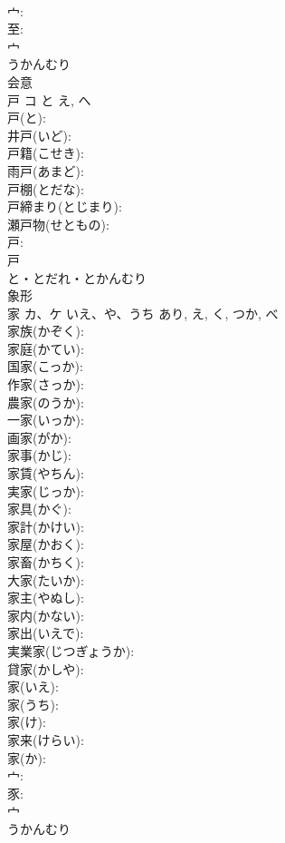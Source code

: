 \documentclass[8pt]{extreport}
\begin{document}
\begin{CJK}{UTF8}{min}
\\	宀: 
\\	至: 
\\	宀	
\\	うかんむり	
\\	会意 
\\	戸	コ	と	え, へ	
\\	戸(と): 
\\	井戸(いど): 
\\	戸籍(こせき): 
\\	雨戸(あまど): 
\\	戸棚(とだな): 
\\	戸締まり(とじまり): 
\\	瀬戸物(せともの): 
\\	戸: 
\\	戸	
\\	と・とだれ・とかんむり	
\\	象形 
\\	家	カ、ケ	いえ、や、うち	あり, え, く, つか, べ	
\\	家族(かぞく): 
\\	家庭(かてい): 
\\	国家(こっか): 
\\	作家(さっか): 
\\	農家(のうか): 
\\	一家(いっか): 
\\	画家(がか): 
\\	家事(かじ): 
\\	家賃(やちん): 
\\	実家(じっか): 
\\	家具(かぐ): 
\\	家計(かけい): 
\\	家屋(かおく): 
\\	家畜(かちく): 
\\	大家(たいか): 
\\	家主(やぬし): 
\\	家内(かない): 
\\	家出(いえで): 
\\	実業家(じつぎょうか): 
\\	貸家(かしや): 
\\	家(いえ): 
\\	家(うち): 
\\	家(け): 
\\	家来(けらい): 
\\	家(か): 
\\	宀: 
\\	豕: 
\\	宀	
\\	うかんむり	

\end{CJK}
\end{document}
